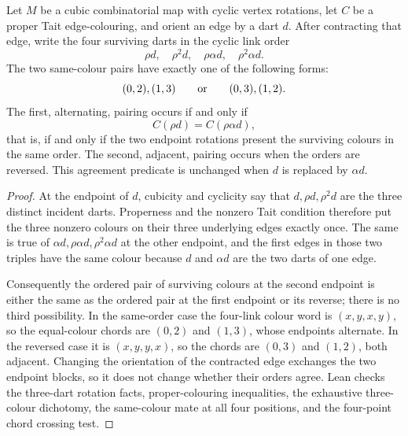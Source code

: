 \begin{theorem}
\label{thm:zero-contraction-chirality}
Let \(M\) be a cubic combinatorial map with cyclic vertex rotations, let
\(C\) be a proper Tait edge-colouring, and orient an edge by a dart \(d\).
After contracting that edge, write the four surviving darts in the cyclic
link order
\[
  \rho d,\quad \rho^2d,\quad \rho\alpha d,\quad
  \rho^2\alpha d.
\]
The two same-colour pairs have exactly one of the following forms:
\[
  (0,2),(1,3)\qquad\hbox{or}\qquad (0,3),(1,2).
\]
The first, alternating, pairing occurs if and only if
\[
 C(\rho d)=C(\rho\alpha d),
\]
that is, if and only if the two endpoint rotations present the surviving
colours in the same order.  The second, adjacent, pairing occurs when the
orders are reversed.  This agreement predicate is unchanged when \(d\) is
replaced by \(\alpha d\).
\end{theorem}

\begin{proof}
At the endpoint of \(d\), cubicity and cyclicity say that
\(d,\rho d,\rho^2d\) are the three distinct incident darts.  Properness and
the nonzero Tait condition therefore put the three nonzero colours on their
three underlying edges exactly once.  The same is true of
\(\alpha d,\rho\alpha d,\rho^2\alpha d\) at the other endpoint, and the first
edges in those two triples have the same colour because \(d\) and
\(\alpha d\) are the two darts of one edge.

Consequently the ordered pair of surviving colours at the second endpoint
is either the same as the ordered pair at the first endpoint or its reverse;
there is no third possibility.  In the same-order case the four-link colour
word is \((x,y,x,y)\), so the equal-colour chords are \((0,2)\) and
\((1,3)\), whose endpoints alternate.  In the reversed case it is
\((x,y,y,x)\), so the chords are \((0,3)\) and \((1,2)\), both adjacent.
Changing the orientation of the contracted edge exchanges the two endpoint
blocks, so it does not change whether their orders agree.  Lean checks the
three-dart rotation facts, proper-colouring inequalities, the exhaustive
three-colour dichotomy, the same-colour mate at all four positions, and the
four-point chord crossing test.
\end{proof}

